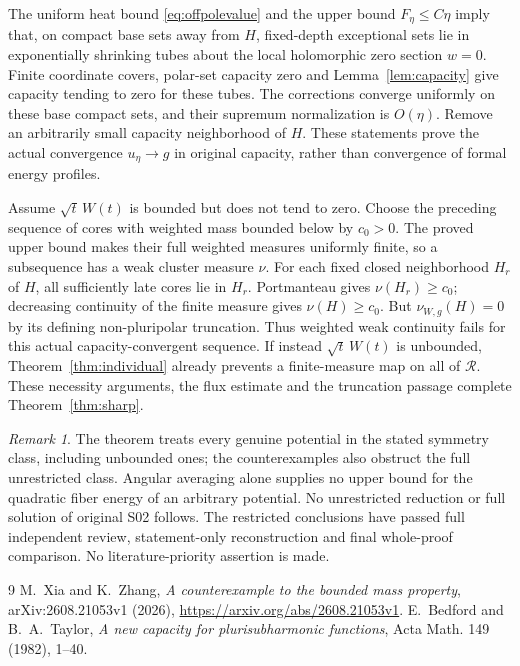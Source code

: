 \documentclass[11pt]{article}
\theoremstyle{remark}
\newtheorem{remark}[theorem]{Remark}
\begin{document}
The uniform heat bound \eqref{eq:offpolevalue} and the upper bound
$F_\eta\leq C\eta$ imply that, on compact base sets away from $H$,
fixed-depth exceptional sets lie in exponentially shrinking tubes about
the local holomorphic zero section $w=0$. Finite coordinate covers,
polar-set capacity zero and Lemma~\ref{lem:capacity} give capacity
tending to zero for these tubes. The corrections converge uniformly on
these base compact sets, and their supremum normalization is $O(\eta)$.
Remove an arbitrarily small capacity neighborhood of $H$. These
statements prove the actual convergence $u_\eta\to g$ in original
capacity, rather than convergence of formal energy profiles.

Assume $\sqrt t\,W(t)$ is bounded but does not tend to zero. Choose
the preceding sequence of cores with weighted mass bounded below by
$c_0>0$. The proved upper bound makes their full weighted measures
uniformly finite, so a subsequence has a weak cluster measure $\nu$.
For each fixed closed neighborhood $H_r$ of $H$, all sufficiently late
cores lie in $H_r$. Portmanteau gives $\nu(H_r)\geq c_0$; decreasing
continuity of the finite measure gives $\nu(H)\geq c_0$.
But $\nu_{W,g}(H)=0$ by its defining non-pluripolar truncation.
Thus weighted weak continuity fails for this actual capacity-convergent
sequence. If instead $\sqrt t\,W(t)$ is unbounded,
Theorem~\ref{thm:individual} already prevents a finite-measure map on
all of $\mathcal R$. These necessity arguments, the flux estimate and
the truncation passage complete Theorem~\ref{thm:sharp}.

\begin{remark}
The theorem treats every genuine potential in the stated symmetry class,
including unbounded ones; the counterexamples also obstruct the full
unrestricted class. Angular averaging alone supplies no upper bound for
the quadratic fiber energy of an arbitrary potential. No unrestricted
reduction or full solution of original S02 follows. The restricted conclusions have passed full independent review,
statement-only reconstruction and final whole-proof comparison. No literature-priority assertion is made.
\end{remark}

\begin{thebibliography}{9}
M.~Xia and K.~Zhang,
\emph{A counterexample to the bounded mass property},
arXiv:2608.21053v1 (2026),
\url{https://arxiv.org/abs/2608.21053v1}.
E.~Bedford and B.~A.~Taylor,
\emph{A new capacity for plurisubharmonic functions},
Acta Math. 149 (1982), 1--40.
\end{thebibliography}
\end{document}
